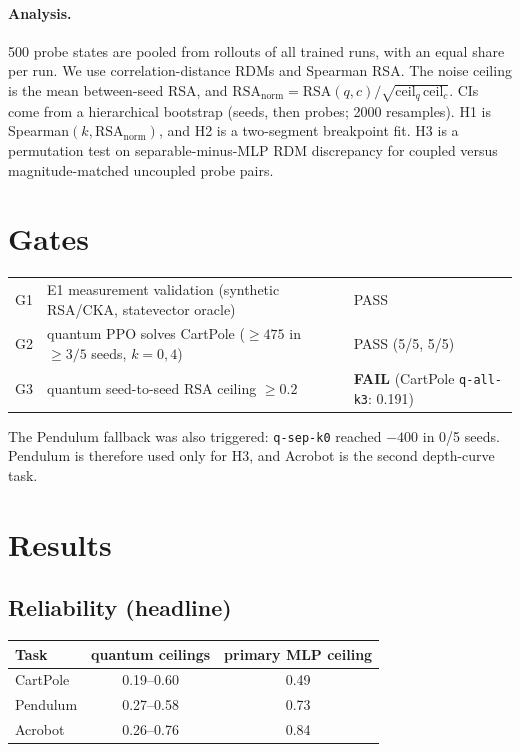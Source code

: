 \documentclass[11pt]{article}
\begin{document}
\paragraph{Analysis.} 500 probe states are pooled from rollouts of all trained runs, with an equal share per run.
We use correlation-distance RDMs and Spearman RSA. The noise ceiling is the mean between-seed RSA, and
$\mathrm{RSA_{norm}} = \mathrm{RSA}(q,c)/\sqrt{\mathrm{ceil}_q\,\mathrm{ceil}_c}$. CIs come from a hierarchical bootstrap
(seeds, then probes; 2000 resamples). H1 is Spearman$(k,\mathrm{RSA_{norm}})$, and H2 is a two-segment
breakpoint fit. H3 is a permutation test on separable-minus-MLP RDM discrepancy for coupled versus magnitude-matched uncoupled probe pairs.

\section{Gates}
\begin{tabular}{lll}\toprule
G1 & E1 measurement validation (synthetic RSA/CKA, statevector oracle) & PASS\\
G2 & quantum PPO solves CartPole ($\geq475$ in $\geq3/5$ seeds, $k=0,4$) & PASS (5/5, 5/5)\\
G3 & quantum seed-to-seed RSA ceiling $\geq 0.2$ & \textbf{FAIL} (CartPole \texttt{q-all-k3}: 0.191)\\\bottomrule
\end{tabular}

\noindent The Pendulum fallback was also triggered: \texttt{q-sep-k0} reached $-400$ in 0/5 seeds. Pendulum
is therefore used only for H3, and Acrobot is the second depth-curve task.

\section{Results}
\subsection{Reliability (headline)}
\begin{tabular}{lcc}\toprule
Task & quantum ceilings & primary MLP ceiling\\\midrule
CartPole & 0.19--0.60 & 0.49\\
Pendulum & 0.27--0.58 & 0.73\\
Acrobot & 0.26--0.76 & 0.84\\\bottomrule
\end{tabular}
\end{document}
